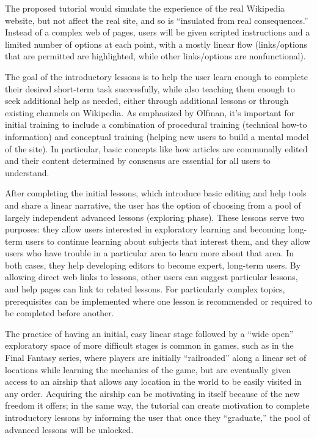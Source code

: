 \documentclass{acm_proc_article-sp}
\begin{document}
The proposed tutorial would simulate the experience of the real Wikipedia website, but not affect the real site, and so is ``insulated from real consequences.'' \cite{Garris:2002} Instead of a complex web of pages, users will be given scripted instructions and a limited number of options at each point, with a mostly linear flow (links/options that are permitted are highlighted, while other links/options are nonfunctional).

The goal of the introductory lessons is to help the user learn enough to complete their desired short-term task successfully, while also teaching them enough to seek additional help as needed, either through additional lessons or through existing channels on Wikipedia. As emphasized by Olfman,\cite{Olfman:1994} it's important for initial training to include a combination of procedural training (technical how-to information) and conceptual training (helping new users to build a mental model of the site). In particular, basic concepts like how articles are communally edited and their content determined by consensus are essential for all users to understand.

After completing the initial lessons, which introduce basic editing and help tools and share a linear narrative, the user has the option of choosing from a pool of largely independent advanced lessons (exploring phase). These lessons serve two purposes: they allow users interested in exploratory learning and becoming long-term users to continue learning about subjects that interest them, and they allow users who have trouble in a particular area to learn more about that area. In both cases, they help developing editors to become expert, long-term users. By allowing direct web links to lessons, other users can suggest particular lessons, and help pages can link to related lessons. For particularly complex topics, prerequisites can be implemented where one lesson is recommended or required to be completed before another.

The practice of having an initial, easy linear stage followed by a ``wide open'' exploratory space of more difficult stages is common in games, such as in the Final Fantasy series, where players are initially ``railroaded'' along a linear set of locations while learning the mechanics of the game, but are eventually given access to an airship that allows any location in the world to be easily visited in any order. Acquiring the airship can be motivating in itself because of the new freedom it offers; in the same way, the tutorial can create motivation to complete introductory lessons by informing the user that once they ``graduate,'' the pool of advanced lessons will be unlocked.
\end{document}
